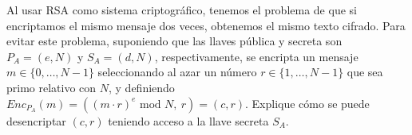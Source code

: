 Al usar RSA como sistema criptográfico, tenemos el problema de que si
encriptamos el mismo mensaje dos veces, obtenemos el mismo texto
cifrado. Para evitar este problema, suponiendo que las llaves pública
y secreta son $P_A=(e, N)$ y $S_A=(d, N)$, respectivamente, se
encripta un mensaje $m \in \{0, \ldots, N-1\}$ seleccionando al azar un número
$r \in \{1, \ldots, N-1\}$ que sea primo relativo con $N$, y
definiendo $\textit{Enc}_{P_A}(m) = ((m \cdot r)^e \text{ mod } N,\
r) = (c,r)$. Explique cómo se puede desencriptar $(c,r)$ teniendo acceso a
la llave secreta $S_A$.
